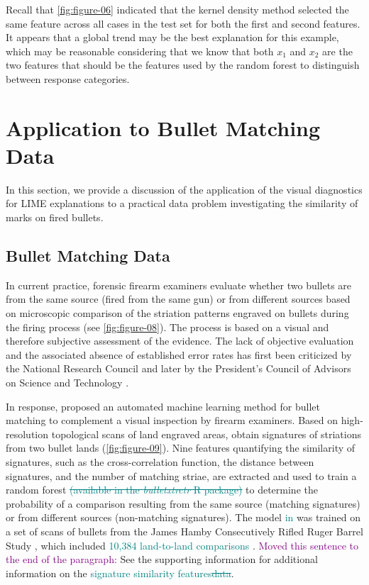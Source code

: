 \documentclass[AMS,STIX2COL]{WileyNJD-v2}\usepackage[]{graphicx}\usepackage[]{color}
\newcommand{\kgc}[1]{\textcolor{purple}{#1}}
\newcommand{\kge}[1]{\textcolor{teal}{#1}}
\begin{document}
Recall that \autoref{fig:figure-06} indicated that the kernel density method selected the same feature across all cases in the test set for both the first and second features. It appears that a global trend may be the best explanation for this example, which may be reasonable considering that we know that both $x_1$ and $x_2$ are the two features that should be the features used by the random forest to distinguish between response categories.

\section{Application to Bullet Matching Data} \label{application}

In this section, we provide a discussion of the application of the visual diagnostics for LIME explanations to a practical data problem investigating the similarity of marks on fired bullets.

\subsection{Bullet Matching Data}







In current practice, forensic firearm examiners evaluate whether two bullets are from the same source (fired from the same gun) or from different sources based on microscopic comparison of the striation patterns engraved on bullets during the firing process (see \autoref{fig:figure-08}). The process is based on a visual and therefore subjective assessment of the evidence. The lack of objective evaluation and the associated absence of established error rates has first been criticized by the National Research Council \cite{nrc:2009} and later by the President's Council of Advisors on Science and Technology \cite{pcast:2016}.

In response, \citet{hare:2017} proposed an automated machine learning method for bullet matching to complement a visual inspection by firearm examiners. Based on high-resolution topological scans of land engraved areas, \citet{hare:2017} obtain signatures of striations from two bullet lands (\autoref{fig:figure-09}). Nine features quantifying the similarity of signatures, such as the cross-correlation function, the distance between signatures, and the number of matching striae, are extracted and used to train a random forest \kge{\sout{(available in the \emph{bulletxtrctr} R package)}} to determine the probability of a comparison resulting from the same source (matching signatures) or from different sources (non-matching signatures). The model \kge{in \citet{hare:2017}} was trained on a set of scans of bullets from the James Hamby Consecutively Rifled Ruger Barrel Study \citep{hamby:2009}, which included \kge{10,384 land-to-land comparisons \citet{hare:2017}}. \kgc{Moved this sentence to the end of the paragraph:} See the supporting information for additional information on the \kge{signature similarity features\sout{data}}.
\end{document}
